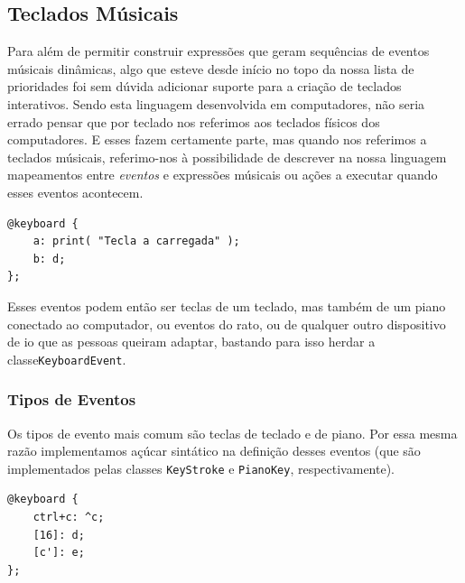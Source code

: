 \subsection{Teclados Músicais}
Para além de permitir construir expressões que geram sequências de eventos músicais dinâmicas, algo que esteve desde início no topo da nossa lista de prioridades foi sem dúvida adicionar suporte para a criação de teclados interativos. Sendo esta linguagem desenvolvida em computadores, não seria errado pensar que por teclado nos referimos aos teclados físicos dos computadores. E esses fazem certamente parte, mas quando nos referimos a teclados músicais, referimo-nos à possibilidade de descrever na nossa linguagem mapeamentos entre \textit{eventos} e expressões músicais ou ações a executar quando esses eventos acontecem.

\begin{lstlisting}[caption={Exemplo de declaração de duas teclas}]
@keyboard {
    a: print( "Tecla a carregada" );
    b: d;
};
\end{lstlisting}

Esses eventos podem então ser teclas de um teclado, mas também de um piano conectado ao computador, ou eventos do rato, ou de qualquer outro dispositivo de \acrshort{io} que as pessoas queiram adaptar, bastando para isso herdar a classe\texttt{KeyboardEvent}.

\subsubsection{Tipos de Eventos}
Os tipos de evento mais comum são teclas de teclado e de piano. Por essa mesma razão implementamos açúcar sintático na definição desses eventos  (que são implementados pelas classes \texttt{KeyStroke} e \texttt{PianoKey}, respectivamente).

\begin{lstlisting}[caption={Declaração de três eventos, o primeiro é uma combinação de teclas, o segundo referência o \textit{virtual key code}, e o terceiro uma nota MIDI}]
@keyboard {
    ctrl+c: ^c;
    [16]: d;
    [c']: e;
};
\end{lstlisting}

